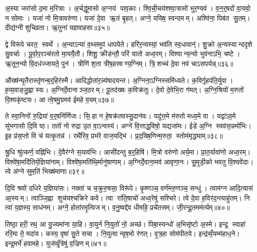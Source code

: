 अ॒स्या जरा॑सो द॒मा म॒रित्राः। अ॒र्चद्धू॑मासो अ॒ग्नय॑ पाव॒काः। श्वि॒ची॒चय॑श्श्वा॒त्रासो॑ भुर॒ण्यव॑। व॒न॒र्॒षदो॑ वा॒यवो॒ न सोमाः। यजा॑ नो मि॒त्रावरु॑णा। यजा॑ दे॒वा ऋ॒तं बृ॒हत्। अग्ने॒ यख्षि॒ स्वन्दमम्। अश्वि॑ना॒ पिब॑त सु॒तम्। दीद्य॑ग्नी शुचिव्रता। ऋ॒तुना॑ यज्ञवाहसा॥३५॥

द्वे विरू॑पे चरत॒ स्वर्थे। अ॒न्याऽन्या॑ व॒थ्समुप॑ धापयेते। हरि॑र॒न्यस्यां॒ भव॑ति स्व॒धावान्॑। शु॒क्रो अ॒न्यस्यान्ददृशे सु॒वर्चाः। पू॒र्वा॒प॒रञ्च॑रतो मा॒ययै॒तौ। शिशू॒ क्रीड॑न्तौ॒ परि॑ यातो अध्व॒रम्। विश्वान्य॒न्यो भुव॑नाऽभि॒ चष्टे। ऋ॒तून॒न्यो वि॒दध॑ज्जायते॒ पुन॑। त्रीणि॑ श॒ता त्रीष॒हस्राण्य॒ग्निम्। त्रि॒शच्च॑ दे॒वा नव॑ चाऽसपर्यन्न्॥३६॥

औख्ष॑न्घृ॒तैरास्तृ॑णन्ब॒र्॒हिर॑स्मै। आदिद्धोता॑र॒न्न्य॑षादयन्त। अ॒ग्निना॒ऽग्निस्समि॑ध्यते। क॒विर्गृ॒हप॑ति॒र्युवा। ह॒व्य॒वाड्जु॒ह्वास्यः। अ॒ग्निर्दे॒वानाञ्ज॒ठरम्। पू॒तद॑ख्षः क॒विक्र॑तुः। दे॒वो दे॒वेभि॒रा ग॑मत्। अ॒ग्नि॒श्रियो॑ म॒रुतो॑ वि॒श्वकृ॑ष्टयः। आ त्वे॒षमु॒ग्रमव॑ ईमहे व॒यम्॥३७॥

ते स्वा॒निनो॑ रु॒द्रिया॑ व॒र्॒षनि॑र्णिजः। सि॒हा न हे॒षक्र॑तवस्सु॒दान॑वः। यदु॑त्त॒मे म॑रुतो मध्य॒मे वा। यद्वा॑ऽव॒मे सु॑भगासो दि॒वि ष्ठ। ततो॑ नो रुद्रा उ॒त वा॒ऽन्वस्य॑। अग्ने॑ वि॒त्ताद्ध॒विषो॒ यद्यजा॑मः। ईडे॑ अ॒ग्नि स्वव॑स॒न्नमो॑भिः। इ॒ह प्र॑स॒प्तो वि च॑ यत्कृ॒तन्न॑। रथै॑रिव॒ प्रभ॑रे वाज॒यद्भि॑। प्र॒द॒ख्षि॒णिन्म॒रुता॒ स्तोम॑मृद्ध्याम्॥३८॥

श्रु॒धि श्रु॑त्कर्ण॒ वह्नि॑भिः। दे॒वैर॑ग्ने स॒याव॑भिः। आसी॑दन्तु ब॒र्॒हिषि॑। मि॒त्रो वरु॑णो अर्य॒मा। प्रा॒त॒र्यावा॑णो अध्व॒रम्। विश्वे॑षा॒मदि॑तिर्य॒ज्ञिया॑नाम्। विश्वे॑षा॒मति॑थि॒र्मानु॑षाणाम्। अ॒ग्निर्दे॒वाना॒मव॑ आवृणा॒नः। सु॒मृ॒डी॒को भवतु वि॒श्ववे॑दाः। त्वे अ॑ग्ने सुम॒तिं भिख्ष॑माणाः॥३९॥

दि॒वि श्रवो॑ दधिरे य॒ज्ञिया॑सः। नक्ता॑ च च॒क्रुरु॒षसा॒ विरू॑पे। कृ॒ष्णञ्च॒ वर्ण॑मरु॒णञ्च॒ सन्धु॑। त्वाम॑ग्न आदि॒त्यास॑ आ॒स्यम्। त्वाञ्जि॒ह्वा शुच॑यश्चक्रिरे कवे। त्वा रा॑ति॒षाचो॑ अध्व॒रेषु॑ सश्चिरे। त्वे दे॒वा ह॒विर॑द॒न्त्याहु॑तम्। नि त्वा॑ य॒ज्ञस्य॒ साध॑नम्। अग्ने॒ होता॑रमृ॒त्विजम्। व॒नु॒ष्वद्दे॑व धीमहि॒ प्रचे॑तसम्। जी॒रन्दू॒तमम॑र्त्यम्॥४०॥\anuvakamend[य॒ज्ञ॒वा॒ह॒सा॒स॒प॒र्य॒न्व॒यमृ॑द्ध्यां॒ भिख्ष॑माणा॒ प्रचे॑तस॒मेक॑ञ्च]

तिष्ठा॒ हरी॒ रथ॒ आ यु॒ज्यमा॑ना या॒हि। वा॒युर्न नि॒युतो॑ नो॒ अच्छ॑। पिबा॒स्यन्धो॑ अ॒भिसृ॑ष्टो अ॒स्मे। इन्द्र॒ स्वाहा॑ ररि॒मा ते॒ मदा॑य। कस्य॒ वृषा॑ सु॒ते सचा। नि॒युत्वान्वृष॒भो र॑णत्। वृ॒त्र॒हा सोम॑पीतये। इन्द्र॑व्वँ॒यम्म॑हाध॒ने। इन्द्र॒मर्भे॑ हवामहे। युज॑व्वृँ॒त्रेषु॑ व॒ज्रिणम्॥४१॥

